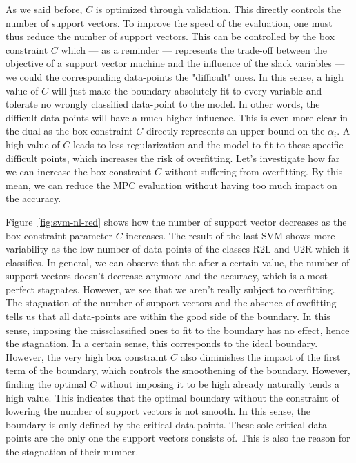 As we said before, $C$ is optimized through validation. This directly controls the number of support vectors. To improve the speed of the evaluation, one must thus reduce the number of support vectors. This can be controlled by the box constraint $C$ which --- as a reminder --- represents the trade-off between the objective of a support vector machine and the influence of the slack variables --- we could the corresponding data-points the "difficult" ones. In this sense, a high value of $C$ will just make the boundary absolutely fit to every variable and tolerate no wrongly classified data-point to the model. In other words, the difficult data-points will have a much higher influence. This is even more clear in the dual as the box constraint $C$ directly represents an upper bound on the $\alpha_i$. A high value of $C$ leads to less regularization and the model to fit to these specific difficult points, which increases the risk of overfitting. Let's investigate how far we can increase the box constraint $C$ without suffering from overfitting. By this mean, we can reduce the MPC evaluation without having too much impact on the accuracy.

Figure~\ref{fig:svm-nl-red} shows how the number of support vector decreases as the box constraint parameter $C$ increases. The result of the last SVM shows more variability as the low number of data-points of the classes R2L and U2R which it classifies. In general, we can observe that the after a certain value, the number of support vectors doesn't decrease anymore and the accuracy, which is almost perfect stagnates. However, we see that we aren't really subject to overfitting. The stagnation of the number of support vectors and the absence of ovefitting tells us that all data-points are within the good side of the boundary. In this sense, imposing the missclassified ones to fit to the boundary has no effect, hence the stagnation. In a certain sense, this corresponds to the ideal boundary. However, the very high box constraint $C$ also diminishes the impact of the first term of the boundary, which controls the smoothening of the boundary. However, finding the optimal $C$ without imposing it to be high already naturally tends a high value. This indicates that the optimal boundary without the constraint of lowering the number of support vectors is not smooth. In this sense, the boundary is only defined by the critical data-points. These sole critical data-points are the only one the support vectors consists of. This is also the reason for the stagnation of their number.

